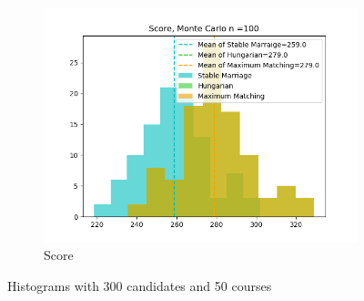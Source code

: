 \documentclass[twoside,twocolumn]{article}
\begin{document}
\begin{figure}[t]
        ~
        \begin{subfigure}{0.32\textwidth}
            \centering
            \includegraphics[width=\textwidth]{../figures/300candidates_50courses_100simulations/scores.png}
            \caption{Score}
        \end{subfigure}
        \caption{Histograms with 300 candidates and 50 courses}
        \label{fig:500can_40cou}
    \end{figure}
\end{document}
